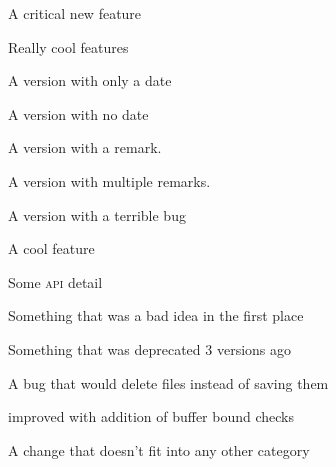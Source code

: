 \documentclass{article}
\begin{document}
\begin{changelog}[author=Rebecca Turner,
	sectioncmd=\subsection,
	title=Example changelog]
\begin{version}
\critical
	\item A critical new feature
\added
	\item Really cool features
\end{version}

\begin{version}[date=2019-01-23, short]
	A version with only a date
\end{version}

\begin{version}[v=1.1.0, simple]
	\item A version with no date
\end{version}

\begin{version}[v=1.0.3, remark=Remark, simple]
	\item A version with a remark.
\end{version}

\begin{version}[v=1.0.2, remarks={Remark 1, Remark 2}, simple]
	\item A version with multiple remarks.
\end{version}

\begin{version}[v=1.0.1, yanked, simple]
	\item A version with a terrible bug
\end{version}

\begin{version}[v=1.0.0, date=2018-10-26]
\added
	\item A cool feature
\changed
	\item Some \textsc{api} detail
\deprecated
	\item Something that was a bad idea in the first place
\removed
	\item Something that was deprecated 3 versions ago
\fixed
	\item A bug that would delete files instead of saving them
\security
	\item improved with addition of buffer bound checks
\misc
	\item A change that doesn't fit into any other category
\end{version}

\end{changelog}
\end{document}
